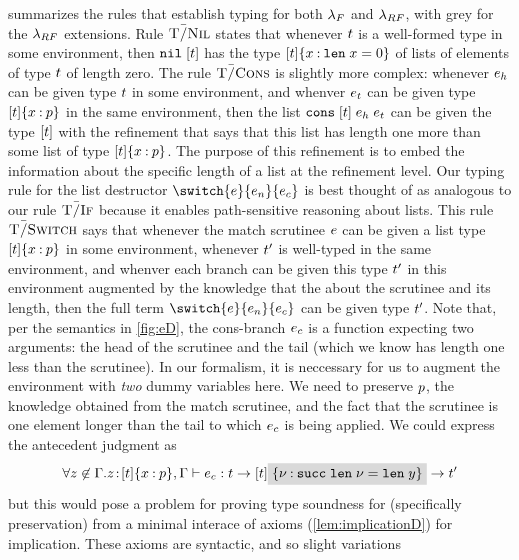 summarizes
the rules that establish typing for both $\lambda_{F}$ and
$\lambda_{RF}$, with grey %
for the $\lambda_{RF}$ extensions.
%
Rule $\textsc{T\=/Nil}$ states that whenever $t$ is a well-formed
type in some environment, then  $\texttt{nil}\;[{t}]$ has the type
${{[t]}\{x \mathbin{:} \mathtt{len}\; x = 0\}}$ of lists of elements
of type $t$ of length zero.
%
The rule $\textsc{T\=/Cons}$ is slightly more complex: whenever $e_h$
can be given type $t$ in some environment, and whenver
$e_t$ can be given type
${{[t]}\{x \mathbin{:} p\}}$ in the same environment,
then the list $\texttt{cons}\;[{t}]\;{e_h}\;{e_t}$ can be given
the type $[t]$ with the refinement that says that
this list has length one more than some list of type
${{[t]}\{x \mathbin{:} p\}}$.
%
The purpose of this refinement is to embed the information about
the specific length of a list at the refinement level.
%
Our typing rule for the list destructor 
$\switch{\sexpr}{\sexpr_n}{\sexpr_c}$ is 
best thought of as analogous to our rule $\textsc{T\=/If}$
because it enables path-sensitive reasoning about lists.
%
This rule $\textsc{T\=/Switch}$ says that whenever the match scrutinee
$e$ can be given a list type 
${{[t]}\{x \mathbin{:} p\}}$ in some environment,
whenever $t'$ is well-typed in the same environment,
and whenver each branch can be given this type
$t'$ in this environment augmented by the knowledge 
that the about the scrutinee and its length, then the full
term $\switch{\sexpr}{\sexpr_n}{\sexpr_c}$ can be given type
$t'$. 
%
Note that, per the semantics in \ref{fig:eD}, the cons-branch
$e_c$ is a function expecting two arguments: the head
of the scrutinee and the tail (which we know has length
one less than the scrutinee).
%
In our formalism, it is neccessary for us to augment the 
environment with \emph{two} dummy variables here. We need
to preserve $p$,
the knowledge obtained from the match scrutinee,
and the fact that the scrutinee is one element longer than
the tail to which $e_c$ is being applied.
%
We could express the antecedent judgment as
\[
\forall\notmem{z}{\tcenv}. 
  \hastype{\bind{z}{\breft{\tlist{\stype}}{x}{p},\tcenv}}
     {\sexpr_c}
     {\funcftype{\stype}{\funcftype{\tlist{\stype}\greybox{\breft{}{\vv}{\suc \len \vv = \len y}}}{\stype'}}}
\]
but this would pose a problem for proving type soundness 
for \sysrfd (specifically preservation)
from a minimal interace of axioms (\ref{lem:implicationD}) 
for implication.
%
These axioms are syntactic, and so slight variations



